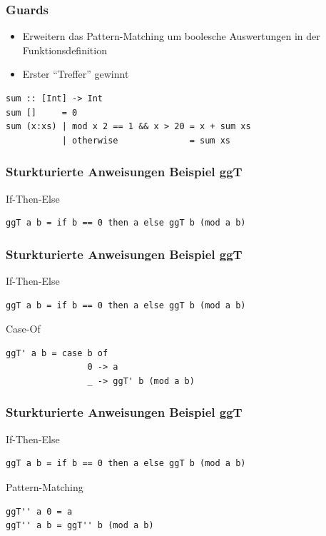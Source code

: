 \documentclass[fleqn,11pt,aspectratio=43]{beamer}
\begin{document}
\begin{frame}[fragile]
\frametitle{Guards}
\begin{block}{\vspace*{-2ex}}
\begin{itemize}
  \item Erweitern das Pattern-Matching um boolesche Auswertungen in der Funktionsdefinition
  \item Erster "`Treffer"' gewinnt
\end{itemize}
\end{block}
\pause
\begin{lstlisting}
sum :: [Int] -> Int
sum []     = 0
sum (x:xs) | mod x 2 == 1 && x > 20 = x + sum xs
           | otherwise              = sum xs
\end{lstlisting}
\end{frame}

\begin{frame}[fragile]
\frametitle{Sturkturierte Anweisungen Beispiel ggT}
\begin{block}{If-Then-Else}
\begin{lstlisting}
ggT a b = if b == 0 then a else ggT b (mod a b)
\end{lstlisting}
\end{block}
\end{frame}

\begin{frame}[fragile]
\addtocounter{framenumber}{-1}
\frametitle{Sturkturierte Anweisungen Beispiel ggT}
\begin{block}{If-Then-Else}
\begin{lstlisting}
ggT a b = if b == 0 then a else ggT b (mod a b)
\end{lstlisting}
\end{block}
\begin{block}{Case-Of}
\begin{lstlisting}
ggT' a b = case b of 
                0 -> a
                _ -> ggT' b (mod a b)
\end{lstlisting}
\end{block}
\end{frame}

\begin{frame}[fragile]
\addtocounter{framenumber}{-1} %
\frametitle{Sturkturierte Anweisungen Beispiel ggT}
\begin{block}{If-Then-Else}
\begin{lstlisting}
ggT a b = if b == 0 then a else ggT b (mod a b)
\end{lstlisting}
\end{block}
\begin{block}{Pattern-Matching}
\begin{lstlisting}
ggT'' a 0 = a
ggT'' a b = ggT'' b (mod a b)
\end{lstlisting}
\end{block}
\end{frame}
\end{document}
